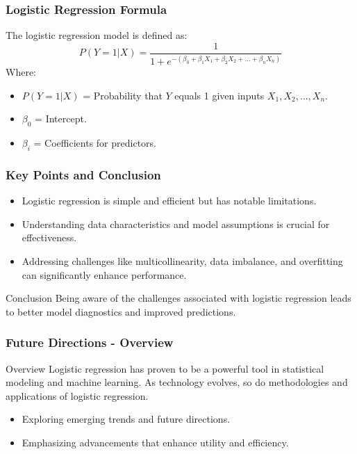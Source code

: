 \documentclass[aspectratio=169]{beamer}
\begin{document}
\begin{frame}[fragile]
    \frametitle{Logistic Regression Formula}
    The logistic regression model is defined as:
    \begin{equation}
        P(Y=1 | X) = \frac{1}{1 + e^{-(\beta_0 + \beta_1X_1 + \beta_2X_2 + \ldots + \beta_nX_n)}}
    \end{equation}
    Where:
    \begin{itemize}
        \item $P(Y=1 | X)$ = Probability that $Y$ equals 1 given inputs $X_1, X_2, \ldots, X_n$.
        \item $\beta_0$ = Intercept.
        \item $\beta_i$ = Coefficients for predictors.
    \end{itemize}
\end{frame}

\begin{frame}[fragile]
    \frametitle{Key Points and Conclusion}
    \begin{itemize}
        \item Logistic regression is simple and efficient but has notable limitations.
        \item Understanding data characteristics and model assumptions is crucial for effectiveness.
        \item Addressing challenges like multicollinearity, data imbalance, and overfitting can significantly enhance performance.
    \end{itemize}
    
    \begin{block}{Conclusion}
        Being aware of the challenges associated with logistic regression leads to better model diagnostics and improved predictions.
    \end{block}
\end{frame}

\begin{frame}[fragile]
    \frametitle{Future Directions - Overview}
    \begin{block}{Overview}
        Logistic regression has proven to be a powerful tool in statistical modeling and machine learning. As technology evolves, so do methodologies and applications of logistic regression.
    \end{block}
    \begin{itemize}
        \item Exploring emerging trends and future directions.
        \item Emphasizing advancements that enhance utility and efficiency.
    \end{itemize}
\end{frame}
\end{document}
